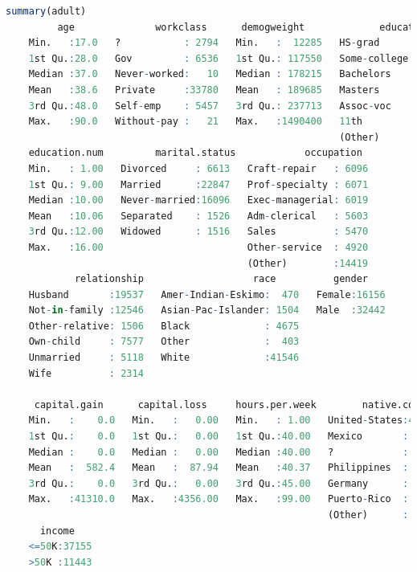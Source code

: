 \documentclass[
]{book}
\theoremstyle{definition}
\theoremstyle{definition}
\theoremstyle{definition}
\theoremstyle{definition}
\theoremstyle{remark}
\begin{document}
\begin{lstlisting}[language=R]
summary(adult)
         age              workclass      demogweight             education    
    Min.   :17.0   ?           : 2794   Min.   :  12285   HS-grad     :15750  
    1st Qu.:28.0   Gov         : 6536   1st Qu.: 117550   Some-college:10860  
    Median :37.0   Never-worked:   10   Median : 178215   Bachelors   : 7962  
    Mean   :38.6   Private     :33780   Mean   : 189685   Masters     : 2627  
    3rd Qu.:48.0   Self-emp    : 5457   3rd Qu.: 237713   Assoc-voc   : 2058  
    Max.   :90.0   Without-pay :   21   Max.   :1490400   11th        : 1812  
                                                          (Other)     : 7529  
    education.num         marital.status            occupation   
    Min.   : 1.00   Divorced     : 6613   Craft-repair   : 6096  
    1st Qu.: 9.00   Married      :22847   Prof-specialty : 6071  
    Median :10.00   Never-married:16096   Exec-managerial: 6019  
    Mean   :10.06   Separated    : 1526   Adm-clerical   : 5603  
    3rd Qu.:12.00   Widowed      : 1516   Sales          : 5470  
    Max.   :16.00                         Other-service  : 4920  
                                          (Other)        :14419  
            relationship                   race          gender     
    Husband       :19537   Amer-Indian-Eskimo:  470   Female:16156  
    Not-in-family :12546   Asian-Pac-Islander: 1504   Male  :32442  
    Other-relative: 1506   Black             : 4675                 
    Own-child     : 7577   Other             :  403                 
    Unmarried     : 5118   White             :41546                 
    Wife          : 2314                                            
                                                                    
     capital.gain      capital.loss     hours.per.week        native.country 
    Min.   :    0.0   Min.   :   0.00   Min.   : 1.00   United-States:43613  
    1st Qu.:    0.0   1st Qu.:   0.00   1st Qu.:40.00   Mexico       :  949  
    Median :    0.0   Median :   0.00   Median :40.00   ?            :  847  
    Mean   :  582.4   Mean   :  87.94   Mean   :40.37   Philippines  :  292  
    3rd Qu.:    0.0   3rd Qu.:   0.00   3rd Qu.:45.00   Germany      :  206  
    Max.   :41310.0   Max.   :4356.00   Max.   :99.00   Puerto-Rico  :  184  
                                                        (Other)      : 2507  
      income     
    <=50K:37155  
    >50K :11443  
                 
                 
                 
                 
   
\end{lstlisting}
\end{document}
